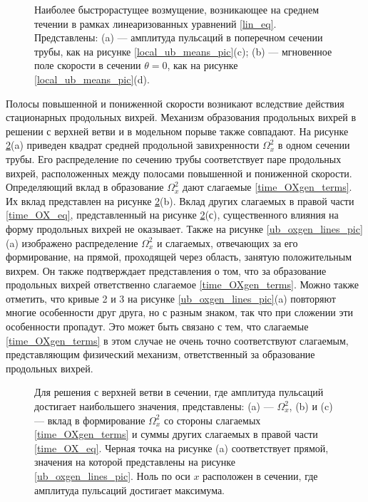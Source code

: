 \begin{figure}
\caption{Наиболее быстрорастущее возмущение, возникающее на среднем течении в рамках линеаризованных уравнений \eqref{lin_eq}. Представлены: (a) --- амплитуда пульсаций в поперечном сечении трубы, как на рисунке \ref{local_ub_means_pic}(c); (b) --- мгновенное поле скорости в сечении $\theta = 0$, как на рисунке \ref{local_ub_means_pic}(d). }
\label{ub_lin_pic}
\end{figure}

Полосы повышенной и пониженной скорости возникают вследствие действия стационарных продольных вихрей. 
Механизм образования продольных вихрей в решении с верхней ветви и в модельном порыве также совпадают. На рисунке \ref{ub_OXgen_pic}(a) приведен квадрат средней продольной завихренности $\Omega_x^2$ в одном сечении трубы. Его распределение по сечению трубы соответствует паре продольных вихрей, расположенных между полосами повышенной и пониженной скорости. Определяющий вклад в образование $\Omega_x^2$ дают слагаемые \eqref{time_OXgen_terms}. Их вклад представлен на рисунке \ref{ub_OXgen_pic}(b). Вклад других слагаемых в правой части \eqref{time_OX_eq}, представленный на рисунке \ref{ub_OXgen_pic}(с), существенного влияния на форму продольных вихрей не оказывает. Также на рисунке \ref{ub_oxgen_lines_pic}(a) изображено распределение $\Omega_x^2$ и слагаемых, отвечающих за его формирование, на прямой, проходящей через область, занятую положительным вихрем. Он также подтверждает представления о том, что за образование продольных вихрей ответственно слагаемое \eqref{time_OXgen_terms}. Можно также отметить, что кривые 2 и 3 на рисунке \ref{ub_oxgen_lines_pic}(a) повторяют многие особенности друг друга, но с разным знаком, так что при сложении эти особенности пропадут. Это может быть связано с тем, что слагаемые \eqref{time_OXgen_terms} в этом случае не очень точно соответствуют слагаемым, представляющим физический механизм, ответственный за образование продольных вихрей. 
 

\begin{figure}
\caption{Для решения с верхней ветви в сечении, где амплитуда пульсаций достигает наибольшего значения, представлены: (a) --- $\Omega_x^2$, (b) и (c) --- вклад в формирование $\Omega_x^2$ со стороны слагаемых \eqref{time_OXgen_terms} и суммы других слагаемых в правой части \eqref{time_OX_eq}. Черная точка на рисунке (a) соответствует прямой, значения на которой представлены на рисунке \ref{ub_oxgen_lines_pic}. Ноль по оси $x$ расположен в сечении, где амплитуда пульсаций достигает максимума.}
\label{ub_OXgen_pic}
\end{figure}

